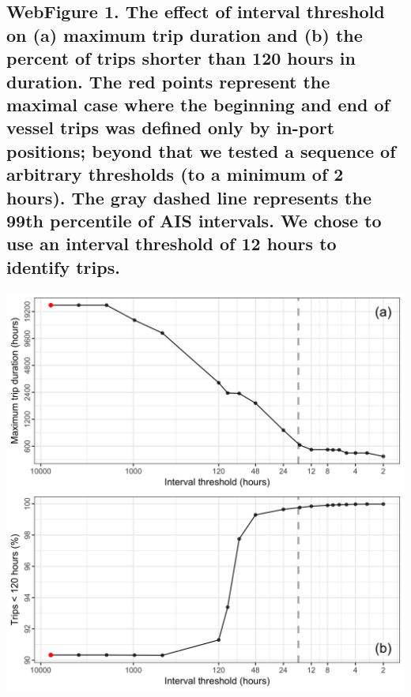 \documentclass[11pt,]{article}
\begin{document}
\newpage

\subsection{WebFigure 1. The effect of interval threshold on (a) maximum
trip duration and (b) the percent of trips shorter than 120 hours in
duration. The red points represent the maximal case where the beginning
and end of vessel trips was defined only by in-port positions; beyond
that we tested a sequence of arbitrary thresholds (to a minimum of 2
hours). The gray dashed line represents the 99th percentile of AIS
intervals. We chose to use an interval threshold of 12 hours to identify
trips.}\label{webfigure-1.-the-effect-of-interval-threshold-on-a-maximum-trip-duration-and-b-the-percent-of-trips-shorter-than-120-hours-in-duration.-the-red-points-represent-the-maximal-case-where-the-beginning-and-end-of-vessel-trips-was-defined-only-by-in-port-positions-beyond-that-we-tested-a-sequence-of-arbitrary-thresholds-to-a-minimum-of-2-hours.-the-gray-dashed-line-represents-the-99th-percentile-of-ais-intervals.-we-chose-to-use-an-interval-threshold-of-12-hours-to-identify-trips.}

\includegraphics[width=1.00000\textwidth]{../ms_1/ms_1_figs/plot_interval_threshold.png}

\newpage
\end{document}
